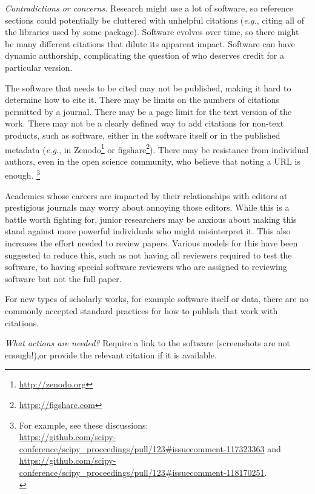 \documentclass[a4paper,UKenglish]{dagman}
\newcommand{\eg}{\emph{e.g.},\xspace}
\begin{document}
\emph{Contradictions or concerns.}
Research might use a lot of software, so reference sections could potentially be cluttered with unhelpful citations (\eg citing all of the libraries used by some package).
Software evolves over time, so there might be many different citations that dilute its apparent impact.
Software can have dynamic authorship, complicating the question of who deserves credit for a particular version.

The software that needs to be cited may not be published, making it hard to determine how to cite it.  There may be limits on the numbers of citations permitted by a journal.  There may be a page limit for the text version of the work.  There may not be a clearly defined way to add citations for non-text products, such as software, either in the software itself or in the published metadata (\eg in Zenodo\footnote{\url{http://zenodo.org}} or figshare\footnote{\url{https://figshare.com}}).
There may be resistance from individual authors, even in the open science community, who believe that noting a URL is enough.%
\footnote{For example, see these discussions:\\
\url{https://github.com/scipy-conference/scipy_proceedings/pull/123\#issuecomment-117323363} and\\
\url{https://github.com/scipy-conference/scipy_proceedings/pull/123\#issuecomment-118170251}.\\
}

Academics whose careers are impacted by their relationships with editors at prestigious journals may worry about annoying those editors. While this is a battle worth fighting for, junior researchers may be anxious about making this stand against more powerful individuals who might misinterpret it.
This also increases the effort needed to review papers.  Various models for this have been suggested to reduce this, such as not having all reviewers required to test the software, to having special software reviewers who are assigned to reviewing software but not the full paper.


For new types of scholarly works, for example software itself or data, there are no commonly accepted standard practices for how to publish that work with citations.

\emph{What actions are needed?}
Require a link to the software (screenshots are not enough!),or provide the relevant citation if it is available.
%
\end{document}
